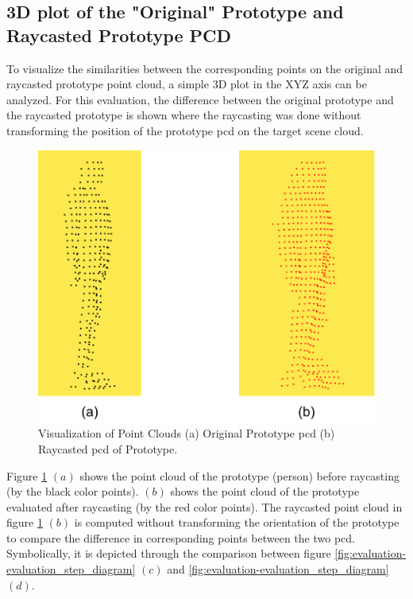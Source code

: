 \subsection{3D plot of the "Original" Prototype and Raycasted Prototype PCD}\label{sec:3dplot}
To visualize the similarities between the corresponding points on the original and raycasted prototype point cloud, a simple 3D plot in the XYZ axis can be analyzed. For this evaluation, the difference between the original prototype and the raycasted prototype is shown where the raycasting was done without transforming the position of the prototype \acrshort{pcd} on the target scene cloud.

\begin{figure}[htbp]
    \centering
    \includegraphics[width=0.75\linewidth]{97_graphics//evaluation/original_vs_raycasted_pcd.pdf}
    \caption[Visualization of Point Clouds.]{Visualization of Point Clouds (a) Original Prototype \acrshort{pcd} (b) Raycasted \acrshort{pcd} of Prototype.}
    \label{fig:evaluation-original_vs_raycasted_pcd}
\end{figure}

Figure \ref{fig:evaluation-original_vs_raycasted_pcd} \((a)\) shows the point cloud of the prototype (person) before raycasting (by the black color points). \((b)\) shows the point cloud of the prototype evaluated after raycasting  (by the red color points). The raycasted point cloud in figure \ref{fig:evaluation-original_vs_raycasted_pcd} \((b)\) is computed without transforming the orientation of the prototype to compare the difference in corresponding points between the two \acrshort{pcd}. Symbolically, it is depicted through the comparison between figure \ref{fig:evaluation-evaluation_step_diagram} \((c)\) and \ref{fig:evaluation-evaluation_step_diagram} \((d)\).

